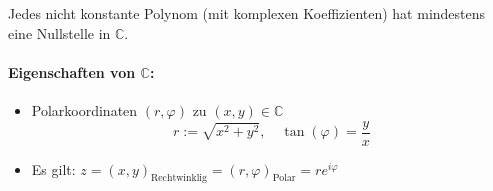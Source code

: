 \documentclass[a4paper,12pt,DIV15]{scrartcl}
\begin{document}
\begin{thm}
    Jedes nicht konstante Polynom (mit komplexen Koeffizienten) hat mindestens eine Nullstelle in $\mathbb{C}$. 
\end{thm}
\paragraph{Eigenschaften von $\mathbb{C}$:}
\begin{itemize}
\item Polarkoordinaten $(r, \varphi)$ zu $(x,y) \in \mathbb{C}$
\[  r:= \sqrt{x^2+y^2}, \quad \tan(\varphi)=\frac{y}{x} \] 

\item Es gilt: $z = (x,y)_{\text{Rechtwinklig}} = (r,\varphi)_{\text{Polar}} = re^{i\varphi}$
\end{itemize}
\end{document}
